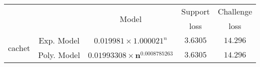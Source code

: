 \begin{tabular}{ccccc} 
\hline 
 &  & \multirow{2}{*}{Model} & Support & Challenge\tabularnewline 
 &  &  & loss  & loss\tabularnewline 
\hline 
\hline 
\multirow{2}{*}{cachet} & Exp. Model & $0.019981\times 1.000021^{n}$ & $3.6305$ & $14.296$ \tabularnewline 
 & Poly. Model & $\mathbf{0.01993308\times n^{0.0008785263}}$ & $\mathbf{3.6305}$ & $\mathbf{14.296}$ \tabularnewline 
\hline 
\end{tabular} 

